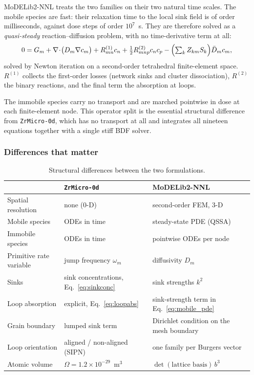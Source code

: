 \documentclass{article}
\newcommand{\MoD}{\textsf{MoDELib2-NNL}}
\newcommand{\ZrOd}{\texttt{ZrMicro-0d}}
\begin{document}
\MoD{} treats the two families on their two natural time scales. The mobile
species are fast: their relaxation time to the local sink field is of order
milliseconds, against dose steps of order $10^7$~s. They are therefore solved as
a \emph{quasi-steady} reaction--diffusion problem, with no time-derivative term
at all:
\begin{equation}
0 = G_m + \nabla\!\cdot\!\bigl(D_m \nabla c_m\bigr)
+ R^{(1)}_{mn} c_n + \tfrac{1}{2} R^{(2)}_{mnp} c_n c_p
- \Bigl(\textstyle\sum_k Z_{km} S_k\Bigr) \bar{D}_m c_m ,
\label{eq:mobile_pde}
\end{equation}
solved by Newton iteration on a second-order tetrahedral finite-element space.
$R^{(1)}$ collects the first-order losses (network sinks and cluster
dissociation), $R^{(2)}$ the binary reactions, and the final term the absorption
at loops.

The immobile species carry no transport and are marched pointwise in dose at each
finite-element node. This operator split is the essential structural difference
from \ZrOd{}, which has no transport at all and integrates all nineteen equations
together with a single stiff BDF solver.

\subsubsection{Differences that matter}

\begin{table}[htbp]
\centering
\caption{Structural differences between the two formulations.}
\label{tab:structure}
\small
\begin{tabular}{@{}p{}p{}p{}@{}}
\toprule
& \ZrOd{} & \MoD{} \\
\midrule
Spatial resolution & none (0-D) & second-order FEM, 3-D \\
Mobile species & ODEs in time & steady-state PDE (QSSA) \\
Immobile species & ODEs in time & pointwise ODEs per node \\
Primitive rate variable & jump frequency $\omega_m$ & diffusivity $D_m$ \\
Sinks & sink concentrations, Eq.~\eqref{eq:sinkconc} & sink strengths $k^2$ \\
Loop absorption & explicit, Eq.~\eqref{eq:loopabs} & sink-strength term in Eq.~\eqref{eq:mobile_pde} \\
Grain boundary & lumped sink term & Dirichlet condition on the mesh boundary \\
Loop orientation & aligned / non-aligned (SIPN) & one family per Burgers vector \\
Atomic volume & $\Omega = 1.2\times10^{-29}$~m$^3$ & $\det(\text{lattice basis})\,b^3$ \\
\bottomrule
\end{tabular}
\end{table}
\end{document}
